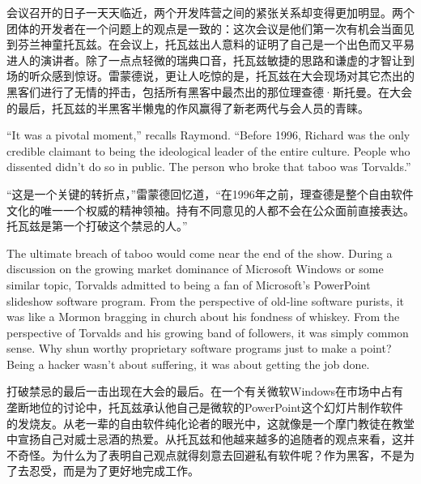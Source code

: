 \ifdefined\chs
会议召开的日子一天天临近，两个开发阵营之间的紧张关系却变得更加明显。两个团体的开发者在一个问题上的观点是一致的：这次会议是他们第一次有机会当面见到芬兰神童托瓦兹。在会议上，托瓦兹出人意料的证明了自己是一个出色而又平易进人的演讲者。除了一点点轻微的瑞典口音，托瓦兹敏捷的思路和谦虚的才智让到场的听众感到惊讶。雷蒙德说，更让人吃惊的是，托瓦兹在大会现场对其它杰出的黑客们进行了无情的抨击，包括所有黑客中最杰出的那位理查德·斯托曼。在大会的最后，托瓦兹的半黑客半懒鬼的作风赢得了新老两代与会人员的青睐。
\fi

\ifdefined\eng
``It was a pivotal moment,'' recalls Raymond. ``Before 1996, Richard was the only credible claimant to being the ideological leader of the entire culture. People who dissented didn't do so in public. The person who broke that taboo was Torvalds.''
\fi

\ifdefined\chs
``这是一个关键的转折点，''雷蒙德回忆道，``在1996年之前，理查德是整个自由软件文化的唯一一个权威的精神领袖。持有不同意见的人都不会在公众面前直接表达。托瓦兹是第一个打破这个禁忌的人。''
\fi

\ifdefined\eng
The ultimate breach of taboo would come near the end of the show. During a discussion on the growing market dominance of Microsoft Windows or some similar topic, Torvalds admitted to being a fan of Microsoft's PowerPoint slideshow software program. From the perspective of old-line software purists, it was like a Mormon bragging in church about his fondness of whiskey. From the perspective of Torvalds and his growing band of followers, it was simply common sense. Why shun worthy proprietary software programs just to make a point? Being a hacker wasn't about suffering, it was about getting the job done.
\fi

\ifdefined\chs
打破禁忌的最后一击出现在大会的最后。在一个有关微软Windows在市场中占有垄断地位的讨论中，托瓦兹承认他自己是微软的PowerPoint这个幻灯片制作软件的发烧友。从老一辈的自由软件纯化论者的眼光中，这就像是一个摩门教徒在教堂中宣扬自己对威士忌酒的热爱。从托瓦兹和他越来越多的追随者的观点来看，这并不奇怪。为什么为了表明自己观点就得刻意去回避私有软件呢？作为黑客，不是为了去忍受，而是为了更好地完成工作。
\fi


